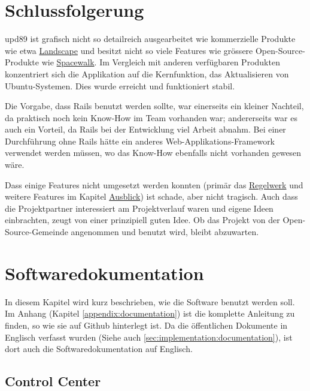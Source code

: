 \section{Schlussfolgerung}
\label{conclusion}

\gls{upd89} ist grafisch nicht so detailreich ausgearbeitet wie kommerzielle Produkte wie etwa \hyperref[sec:analysis:competition:landscape]{Landscape} und besitzt nicht so viele Features wie grössere Open-Source-Produkte wie \hyperref[sec:analysis:competition:spacewalk]{Spacewalk}. Im Vergleich mit anderen verfügbaren Produkten konzentriert sich die Applikation auf die Kernfunktion, das Aktualisieren von Ubuntu-Systemen. Dies wurde erreicht und funktioniert stabil.

Die Vorgabe, dass Rails benutzt werden sollte, war einerseits ein kleiner Nachteil, da praktisch noch kein Know-How im Team vorhanden war; andererseits war es auch ein Vorteil, da Rails bei der Entwicklung viel Arbeit abnahm. Bei einer Durchführung ohne Rails hätte ein anderes Web-Applikations-Framework verwendet werden müssen, wo das Know-How ebenfalls nicht vorhanden gewesen wäre.

Dass einige Features nicht umgesetzt werden konnten (primär das \hyperref[sec:ausblick:regelwerk]{Regelwerk} und weitere Features im Kapitel \hyperref[sec:ausblick]{Ausblick}) ist schade, aber nicht tragisch. Auch dass die Projektpartner interessiert am Projektverlauf waren und eigene Ideen einbrachten, zeugt von einer prinzipiell guten Idee. Ob das Projekt von der Open-Source-Gemeinde angenommen und benutzt wird, bleibt abzuwarten.


\section{Softwaredokumentation} \label{documentation}

In diesem Kapitel wird kurz beschrieben, wie die Software benutzt werden soll. Im Anhang (Kapitel \ref{appendix:documentation}) ist die komplette Anleitung zu finden, so wie sie auf Github hinterlegt ist. Da die öffentlichen Dokumente in Englisch verfasst wurden (Siehe auch \ref{sec:implementation:documentation}), ist dort auch die Softwaredokumentation auf Englisch.

\subsection*{Control Center}

